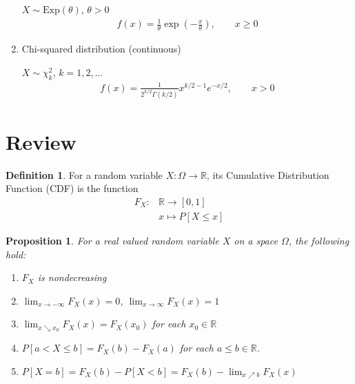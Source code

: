 \documentclass[11pt]{amsart}
\newtheorem{proposition}[theorem]{Proposition}
\theoremstyle{definition}
\newtheorem{definition}[theorem]{Definition}
\numberwithin{equation}{section}
\begin{document}
\begin{enumerate}
    $X\sim\mathrm{Exp}(\theta)$, $\theta>0$
    \begin{align*}
        f(x)=\frac{1}{\theta}\exp(-\frac{x}{\theta}), \qquad x\ge0
    \end{align*}
    \item Chi-squared distribution (continuous)

    $X\sim\chi^2_k$, $k=1,2,\ldots$
    \begin{align*}
        f(x)=\frac{1}{2^{k/2}\Gamma(k/2)}x^{k/2-1}e^{-x/2},\qquad x>0
    \end{align*}
    
\end{enumerate}
\newpage
\section{Review}
\begin{definition}
    For a random variable $X:\Omega\to\mathbb R$, its Cumulative Distribution Function (CDF) is the function
    \begin{align*}
        F_X:&\mathbb R\to[0,1]\\
        &x\mapsto P[X\le x]
    \end{align*}
\end{definition}
\begin{proposition} For a real valued random variable $X$ on a space $\Omega$, the following hold:
    \begin{enumerate}
        \item [(i)] $F_X$ is nondecreasing
        \item [(ii)] $\lim_{x\to-\infty}F_X(x)=0$, $\lim_{x\to\infty}F_X(x)=1$
        \item [(iii)] $\lim_{x\searrow x_0}F_X(x)=F_X(x_0)$ for each $x_0\in\mathbb R$
        \item [(iv)] $P[a<X\le b]=F_X(b)-F_X(a)$ for each $a\le b\in\mathbb R$.
        \item [(v)] $P[X=b]=F_X(b)-P[X<b]=F_X(b)-\lim_{x\nearrow b}F_X(x)$
    \end{enumerate}
\end{proposition}
\end{document}
